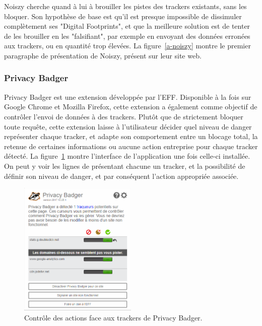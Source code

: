 			Noiszy cherche quand à lui à brouiller les pistes des trackers existants, sans les bloquer. Son hypothèse de base est qu'il est presque impossible de dissimuler complètement ses "Digital Footprints", et que la meilleure solution est de tenter de les brouiller en les "falsifiant", par exemple en envoyant des données erronées aux trackers, ou en quantité trop élevées.
			La figure~\ref{a-noiszy} montre le premier paragraphe de présentation de Noiszy, présent sur leur site web.

		\subsubsection{Privacy Badger}

			Privacy Badger est une extension développée par l'EFF\cite{eff}. Disponible à la fois sur Google Chrome et Mozilla Firefox, cette extension a également comme objectif de contrôler l'envoi de données à des trackers.
			Plutôt que de strictement bloquer toute requête, cette extension laisse à l'utilisateur décider quel niveau de danger représenter chaque tracker, et adapte son comportement entre un blocage total, la retenue de certaines informations ou aucune action entreprise pour chaque tracker détecté.
			La figure~\ref{a-privacybadger} montre l'interface de l'application une fois celle-ci installée. On peut y voir les lignes de présentant chacune un tracker, et la possibilité de définir son niveau de danger, et par conséquent l'action appropriée associée.

			\begin{figure}[h]
				\centering
				\includegraphics[width=0.5\textwidth]{images/analysis/privacybadger}
				\caption{Contrôle des actions face aux trackers de Privacy Badger\cite{privacybadger}.}
				\label{a-privacybadger}
			\end{figure}

